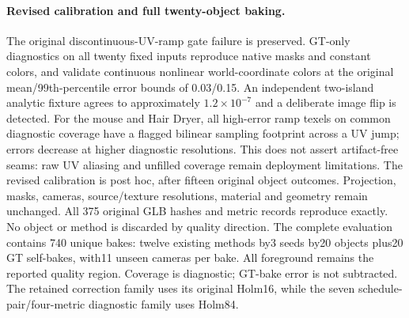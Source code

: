 \documentclass[11pt]{article}
\begin{document}
\paragraph{Revised calibration and full twenty-object baking.}
The original discontinuous-UV-ramp gate failure is preserved. GT-only diagnostics on all twenty fixed inputs reproduce native masks and constant colors, and validate continuous nonlinear world-coordinate colors at the original mean/99th-percentile error bounds of 0.03/0.15. An independent two-island analytic fixture agrees to approximately $1.2\times10^{-7}$ and a deliberate image flip is detected. For the mouse and Hair Dryer, all high-error ramp texels on common diagnostic coverage have a flagged bilinear sampling footprint across a UV jump; errors decrease at higher diagnostic resolutions. This does not assert artifact-free seams: raw UV aliasing and unfilled coverage remain deployment limitations. The revised calibration is post hoc, after fifteen original object outcomes. Projection, masks, cameras, source/texture resolutions, material and geometry remain unchanged. All 375 original GLB hashes and metric records reproduce exactly. No object or method is discarded by quality direction.
The complete evaluation contains 740 unique bakes: twelve existing methods by3 seeds by20 objects plus20 GT self-bakes, with11 unseen cameras per bake. All foreground remains the reported quality region. Coverage is diagnostic; GT-bake error is not subtracted. The retained correction family uses its original Holm16, while the seven schedule-pair/four-metric diagnostic family uses Holm84.
\end{document}
